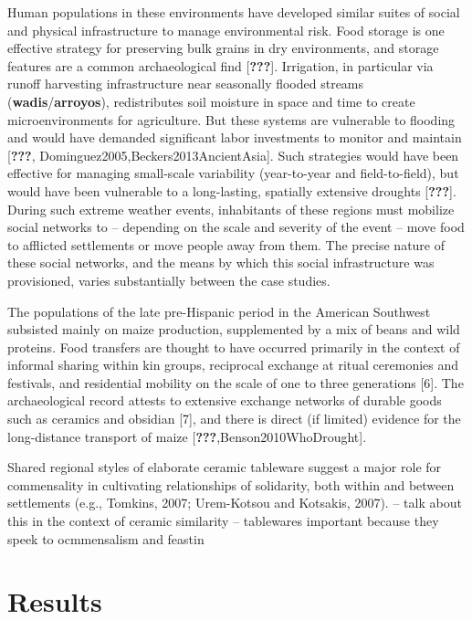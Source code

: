 \documentclass[10pt,letterpaper]{article}
\begin{document}
Human populations in these environments have developed similar suites of
social and physical infrastructure to manage environmental risk. Food
storage is one effective strategy for preserving bulk grains in dry
environments, and storage features are a common archaeological find
{[}{\textbf{???}}{]}. Irrigation, in particular via runoff harvesting
infrastructure near seasonally flooded streams
(\textbf{wadis}/\textbf{arroyos}), redistributes soil moisture in space
and time to create microenvironments for agriculture. But these systems
are vulnerable to flooding and would have demanded significant labor
investments to monitor and maintain {[}{\textbf{???}},
Dominguez2005,Beckers2013AncientAsia{]}. Such strategies would have been
effective for managing small-scale variability (year-to-year and
field-to-field), but would have been vulnerable to a long-lasting,
spatially extensive droughts {[}{\textbf{???}}{]}. During such extreme
weather events, inhabitants of these regions must mobilize social
networks to -- depending on the scale and severity of the event -- move
food to afflicted settlements or move people away from them. The precise
nature of these social networks, and the means by which this social
infrastructure was provisioned, varies substantially between the case
studies.

The populations of the late pre-Hispanic period in the American
Southwest subsisted mainly on maize production, supplemented by a mix of
beans and wild proteins. Food transfers are thought to have occurred
primarily in the context of informal sharing within kin groups,
reciprocal exchange at ritual ceremonies and festivals, and residential
mobility on the scale of one to three generations {[}6{]}. The
archaeological record attests to extensive exchange networks of durable
goods such as ceramics and obsidian {[}7{]}, and there is direct (if
limited) evidence for the long-distance transport of maize
{[}{\textbf{???}},Benson2010WhoDrought{]}.

Shared regional styles of elaborate ceramic tableware suggest a major
role for commensality in cultivating relationships of solidarity, both
within and between settlements (e.g., Tomkins, 2007; Urem-Kotsou and
Kotsakis, 2007). -- talk about this in the context of ceramic similarity
-- tablewares important because they speek to ocmmensalism and feastin

\section{Results}\label{results}
\end{document}
